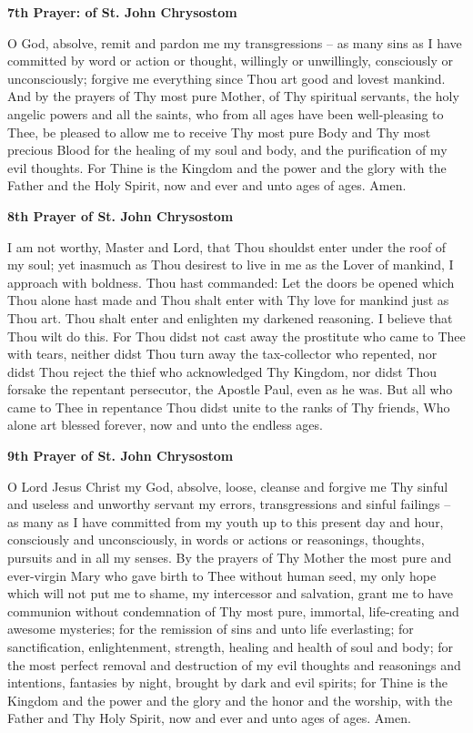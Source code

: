 \begin{center}
	\textbf{7th Prayer: of St. John Chrysostom}
\end{center}

O God, absolve, remit and pardon me my transgressions -- as many sins as I have committed by word or action or thought, willingly or unwillingly, consciously or unconsciously; forgive me everything since Thou art good and lovest mankind. And by the prayers of Thy most pure Mother, of Thy spiritual servants, the holy angelic powers and all the saints, who from all ages have been well-pleasing to Thee, be pleased to allow me to receive Thy most pure Body and Thy most precious Blood for the healing of my soul and body, and the purification of my evil thoughts. For Thine is the Kingdom and the power and the glory with the Father and the Holy Spirit, now and ever and unto ages of ages. Amen.

\begin{center}
	\textbf{8th Prayer of St. John Chrysostom}
\end{center}

I am not worthy, Master and Lord, that Thou shouldst enter under the roof of my soul; yet inasmuch as Thou desirest to live in me as the Lover of mankind, I approach with boldness. Thou hast commanded: Let the doors be opened which Thou alone hast made and Thou shalt enter with Thy love for mankind just as Thou art. Thou shalt enter and enlighten my darkened reasoning. I believe that Thou wilt do this. For Thou didst not cast away the prostitute who came to Thee with tears, neither didst Thou turn away the tax-collector who repented, nor didst Thou reject the thief who acknowledged Thy Kingdom, nor didst Thou forsake the repentant persecutor, the Apostle Paul, even as he was. But all who came to Thee in repentance Thou didst unite to the ranks of Thy friends, Who alone art blessed forever, now and unto the endless ages. 

\begin{center}
	\textbf{9th Prayer of St. John Chrysostom}
\end{center}

O Lord Jesus Christ my God, absolve, loose, cleanse and forgive me Thy sinful and useless and unworthy servant my errors, transgressions and sinful failings -- as many as I have committed from my youth up to this present day and hour, consciously and unconsciously, in words or actions or reasonings, thoughts, pursuits and in all my senses. By the prayers of Thy Mother the most pure and ever-virgin Mary who gave birth to Thee without human seed, my only hope which will not put me to shame, my intercessor and salvation, grant me to have communion without condemnation of Thy most pure, immortal, life-creating and awesome mysteries; for the remission of sins and unto life everlasting; for sanctification, enlightenment, strength, healing and health of soul and body; for the most perfect removal and destruction of my evil thoughts and reasonings and intentions, fantasies by night, brought by dark and evil spirits; for Thine is the Kingdom and the power and the glory and the honor and the worship, with the Father and Thy Holy Spirit, now and ever and unto ages of ages. Amen. 

